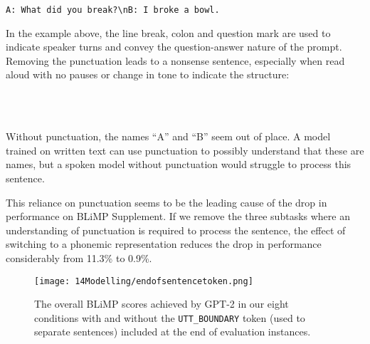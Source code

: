 \vspace{-1mm}
\begin{center}
\begin{verbatim}
A: What did you break?\nB: I broke a bowl.
\end{verbatim}
\end{center}
\vspace{-1mm}

In the example above, the line break, colon and question mark are used to indicate speaker turns and convey the question-answer nature of the prompt. Removing the punctuation leads to a nonsense sentence, especially when read aloud with no pauses or change in tone to indicate the structure:

\vspace{-1mm}
\begin{center}
~\textvisiblespace~~\textvisiblespace~~\textvisiblespace~~\textvisiblespace~~~~\textvisiblespace~~\textvisiblespace~~\textvisiblespace\\~\textvisiblespace~~\textvisiblespace~~\textvisiblespace
\end{center}
\vspace{-1mm}

Without punctuation, the names ``A'' and ``B'' seem out of place. A model trained on written text can use punctuation to possibly understand that these are names, but a spoken model without punctuation would struggle to process this sentence.

This reliance on punctuation seems to be the leading cause of the drop in performance on BLiMP Supplement. If we remove the three subtasks where an understanding of punctuation is required to process the sentence, the effect of switching to a phonemic representation reduces the drop in performance considerably from 11.3\% to 0.9\%.

\begin{figure}[t]
    \centering
    \texttt{[image: 14Modelling/endofsentencetoken.png]}
    \caption{The overall BLiMP scores achieved by GPT-2 in our eight conditions with and without the \texttt{UTT\_BOUNDARY} token (used to separate sentences) included at the end of evaluation instances.}
    \label{fix:14-endofsentencetoken}
\end{figure}

